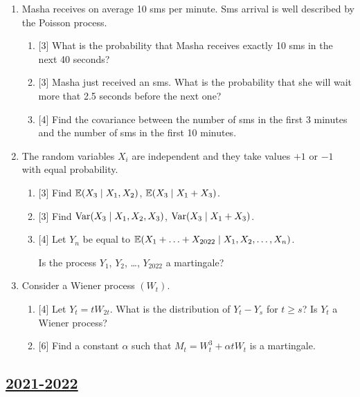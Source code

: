 \begin{enumerate}
  
  \item Masha receives on average 10 sms per minute. Sms arrival is well described by the Poisson process. 
  
  \begin{enumerate}
  \item {[3]} What is the probability that Masha receives exactly 10 sms in the next 40 seconds?
  \item {[3]} Masha just received an sms. What is the probability that she will wait more that 2.5 seconds before the next one?
  \item {[4]} Find the covariance between the number of sms in the first 3 minutes and the number of sms in the first 10 minutes. 
  \end{enumerate}
  
  
  \item The random variables $X_i$ are independent and they take values $+1$ or $-1$ with equal probability. 
  
  \begin{enumerate}
  \item {[3]} Find $\operatorname{\mathbb{E}}(X_3 \mid X_1, X_2)$, $\operatorname{\mathbb{E}}(X_3 \mid X_1 + X_3)$.
  \item {[3]} Find $\operatorname{Var}(X_3 \mid X_1, X_2, X_3)$, $\operatorname{Var}(X_3 \mid X_1 + X_3)$.
  \item {[4]} Let $Y_n$ be equal to $\operatorname{\mathbb{E}}(X_1 + \ldots +  X_{2022} \mid X_1, X_2, \ldots, X_n)$. 
  
  Is the process $Y_1$, $Y_2$, \ldots, $Y_{2022}$ a martingale?
  \end{enumerate}
  
  
  \item Consider a Wiener process $(W_t)$.
  \begin{enumerate}
      \item {[4]} Let $Y_t = t W_{2t}$. What is the distribution of $Y_t - Y_s$ for $t\geq s$? Is $Y_t$ a Wiener process?
      \item {[6]} Find a constant $\alpha$ such that $M_t = W_t^3 + \alpha t W_t$ is a martingale. 
  \end{enumerate}
  
  
  
  \end{enumerate}
  



\subsection[2021-2022]{\hyperref[sec:sol_kr_01_2021_2022]{2021-2022}}
\label{sec:kr_01_2021_2022} %

